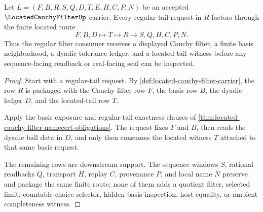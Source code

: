 \begin{theorem}
\label{thm:located-cauchy-filter-regular-tail-location}
Let $L=(F,B,R,S,Q,D,T,E,H,C,P,N)$ be an accepted $\LocatedCauchyFilterUp$ carrier. Every regular-tail request in $R$ factors through the finite located route
$$
F,B,D \longmapsto T \longmapsto R \longmapsto S,Q,H,C,P,N .
$$
Thus the regular filter consumer receives a displayed Cauchy filter, a finite basis neighborhood, a dyadic tolerance ledger, and a located-tail witness before any sequence-facing readback or real-facing seal can be inspected.
\end{theorem}
\begin{proof}
Start with a regular-tail request. By \autoref{def:located-cauchy-filter-carrier}, the row $R$ is packaged with the Cauchy filter row $F$, the basis row $B$, the dyadic ledger $D$, and the located-tail row $T$.

Apply the basis exposure and regular-tail exactness clauses of \autoref{thm:located-cauchy-filter-namecert-obligations}. The request fixes $F$ and $B$, then reads the dyadic ball data in $D$, and only then consumes the located witness $T$ attached to that same basis request.

The remaining rows are downstream support. The sequence windows $S$, rational readbacks $Q$, transport $H$, replay $C$, provenance $P$, and local name $N$ preserve and package the same finite route; none of them adds a quotient filter, selected limit, countable-choice selector, hidden basis inspection, host equality, or ambient completeness witness.
\end{proof}

